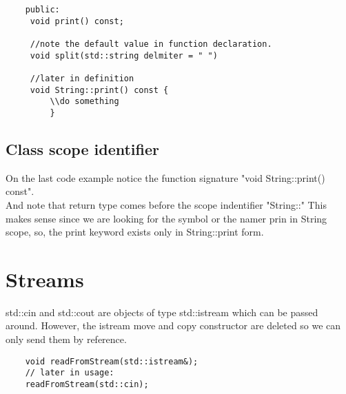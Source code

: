 \documentclass[11pt,twoside,a4paper]{report}
\begin{document}
\begin{lstlisting}
    public:
     void print() const;

     //note the default value in function declaration.
     void split(std::string delmiter = " ")

     //later in definition
     void String::print() const {
         \\do something
         }
\end{lstlisting}

\section{Class scope identifier}
On the last code example notice the function signature "void String::print() const".\\
And note that return type comes before the scope indentifier "String::" This makes sense since we are looking for the symbol or the namer prin in String scope,
so, the print keyword exists only in String::print form.

\chapter{Streams}
std::cin and std::cout are objects of type std::istream which can be passed around. However, the istream move and copy constructor are deleted so we can only send them by reference.

\begin{lstlisting}
    void readFromStream(std::istream&);
    // later in usage:
    readFromStream(std::cin);
\end{lstlisting}
\end{document}
